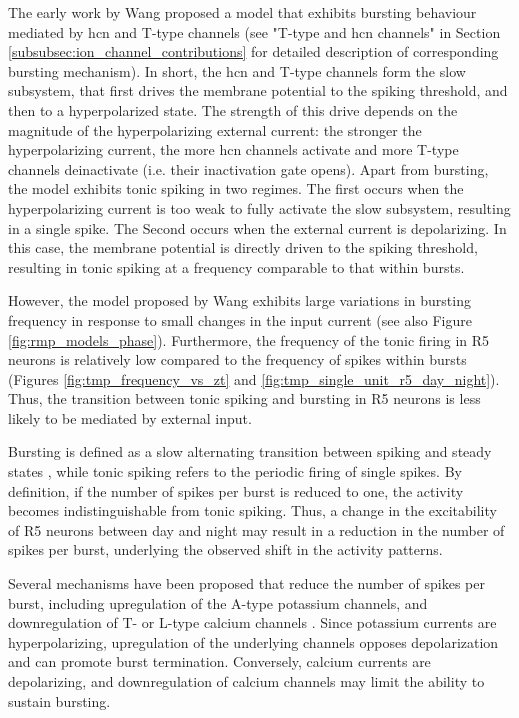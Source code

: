\documentclass[../main.tex]{subfiles}
\begin{document}
The early work by Wang \parencite{wangMultipleDynamicalModes1994} proposed a model that exhibits bursting behaviour mediated by \gls{hcn} and T-type channels (see "T-type and \gls{hcn} channels" in Section \ref{subsubsec:ion_channel_contributions} for detailed description of corresponding bursting mechanism). In short, the \gls{hcn} and T-type channels form the slow subsystem, that first drives the membrane potential to the spiking threshold, and then to a hyperpolarized state. The strength of this drive depends on the magnitude of the hyperpolarizing external current: the stronger the hyperpolarizing current, the more \gls{hcn} channels activate and more T-type channels deinactivate (i.e. their inactivation gate opens). Apart from bursting, the model exhibits tonic spiking in two regimes. The first occurs when the hyperpolarizing current is too weak to fully activate the slow subsystem, resulting in a single spike. The Second occurs when the external current is depolarizing. In this case, the membrane potential is directly driven to the spiking threshold, resulting in tonic spiking at a frequency comparable to that within bursts.

However, the model proposed by Wang exhibits large variations in bursting frequency in response to small changes in the input current (see also Figure \ref{fig:rmp_models_phase}). Furthermore, the frequency of the tonic firing in R5 neurons is relatively low compared to the frequency of spikes within bursts (Figures \ref{fig:tmp_frequency_vs_zt} and \ref{fig:tmp_single_unit_r5_day_night}). Thus, the transition between tonic spiking and bursting in R5 neurons is less likely to be mediated by external input.

Bursting is defined as a slow alternating transition between spiking and steady states \parencite{rinzelFormalClassificationBursting1987}, while tonic spiking refers to the periodic firing of single spikes. By definition, if the number of spikes per burst is reduced to one, the activity becomes indistinguishable from tonic spiking. Thus, a change in the excitability of R5 neurons between day and night may result in a reduction in the number of spikes per burst, underlying the observed shift in the activity patterns.

Several mechanisms have been proposed that reduce the number of spikes per burst, including upregulation of the A-type potassium channels, and downregulation of T- or L-type calcium channels \parencite{franciRobustTunableBursting2018,parkMathematicalModelSubthalamic2021}. Since potassium currents are hyperpolarizing, upregulation of the underlying channels opposes depolarization and can promote burst termination. Conversely, calcium currents are depolarizing, and downregulation of calcium channels may limit the ability to sustain bursting.
\end{document}
